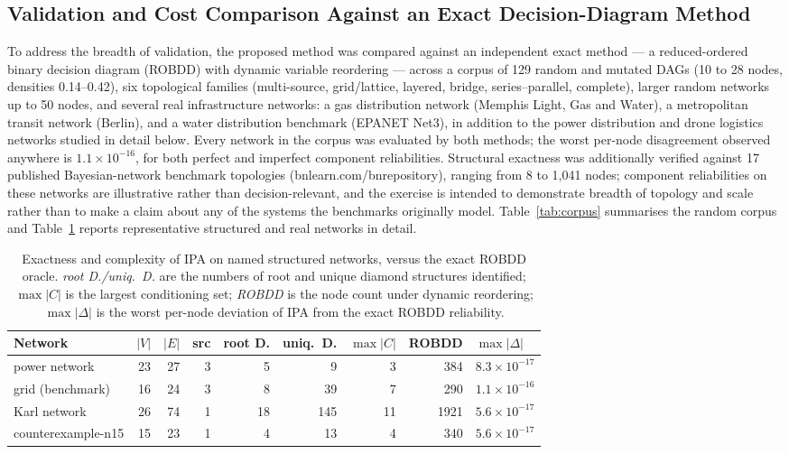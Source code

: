 \documentclass[preprint,12pt]{elsarticle}
\theoremstyle{definition}
\begin{document}
\subsection{Validation and Cost Comparison Against an Exact Decision-Diagram Method}\label{sec:comparison}

To address the breadth of validation, the proposed method was compared against an independent exact
method --- a reduced-ordered binary decision diagram (ROBDD) with dynamic variable reordering --- across
a corpus of 129 random and mutated DAGs (10 to 28 nodes, densities 0.14--0.42), six topological families
(multi-source, grid/lattice, layered, bridge, series--parallel, complete), larger random networks up to
50 nodes, and several real infrastructure networks: a gas distribution network (Memphis Light, Gas and
Water), a metropolitan transit network (Berlin), and a water distribution benchmark (EPANET Net3), in
addition to the power distribution and drone logistics networks studied in detail below. Every network in
the corpus was evaluated by both methods; the worst per-node disagreement observed anywhere is
$1.1\times10^{-16}$, for both perfect and imperfect component reliabilities. Structural exactness was
additionally verified against 17 published Bayesian-network benchmark topologies (bnlearn.com/bnrepository),
ranging from 8 to 1{,}041 nodes; component reliabilities on these networks are illustrative rather than
decision-relevant, and the exercise is intended to demonstrate breadth of topology and scale rather than
to make a claim about any of the systems the benchmarks originally model. Table~\ref{tab:corpus} summarises
the random corpus and Table~\ref{tab:structured} reports representative structured and real networks in
detail.

\begin{table}[t]
\centering\small
\caption{Exactness and complexity of IPA on named structured networks, versus the exact ROBDD oracle.
\emph{root D./uniq.\ D.} are the numbers of root and unique diamond structures identified;
$\max|C|$ is the largest conditioning set; \emph{ROBDD} is the node count under dynamic reordering;
$\max|\Delta|$ is the worst per-node deviation of IPA from the exact ROBDD reliability.}
\label{tab:structured}
\begin{tabular}{lrrrrrrrl}
\toprule
Network & $|V|$ & $|E|$ & src & root D. & uniq.\ D. & $\max|C|$ & ROBDD & $\max|\Delta|$\\
\midrule
power network      & 23 & 27 & 3 &  5 &   9 &  3 &  384 & $8.3\times10^{-17}$\\
grid (benchmark)   & 16 & 24 & 3 &  8 &  39 &  7 &  290 & $1.1\times10^{-16}$\\
Karl network       & 26 & 74 & 1 & 18 & 145 & 11 & 1921 & $5.6\times10^{-17}$\\
counterexample-n15 & 15 & 23 & 1 &  4 &  13 &  4 &  340 & $5.6\times10^{-17}$\\
\bottomrule
\end{tabular}
\end{table}
\end{document}
